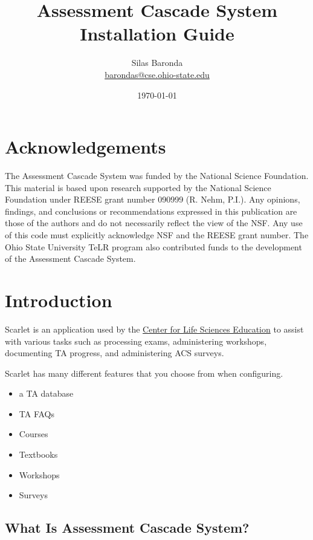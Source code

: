 \documentclass[pdftex,11pt,letterpaper]{article}
\begin{document}
\title{Assessment Cascade System Installation Guide}
\author{Silas Baronda\\\href{mailto:barondas@cse.ohio-state.edu}{barondas@cse.ohio-state.edu}}

\date{\today}
\maketitle

\tableofcontents
\newpage

\listoffigures
\newpage

\section{Acknowledgements}

The Assessment Cascade System was funded by the National Science Foundation.  
This material is based upon research supported by the National Science 
Foundation under REESE grant number 090999 (R. Nehm, P.I.). Any opinions, 
findings, and conclusions or recommendations expressed in this publication are 
those of the authors and do not necessarily reflect the view of the NSF. Any 
use of this code must explicitly acknowledge NSF and the REESE grant number.  
The Ohio State University TeLR program also contributed funds to the 
development of the Assessment Cascade System. 

\newpage

\section{Introduction}

Scarlet is an application used by the \href{http://biology.osu.edu/}{Center for Life Sciences Education} to assist with various tasks such as processing exams, administering workshops, documenting TA progress, and administering ACS surveys.

Scarlet has many different features that you choose from when configuring.

\begin{itemize}
\item a TA database
\item TA FAQs
\item Courses
\item Textbooks
\item Workshops
\item Surveys
\end{itemize}

\subsection{What Is Assessment Cascade System?}
\end{document}
